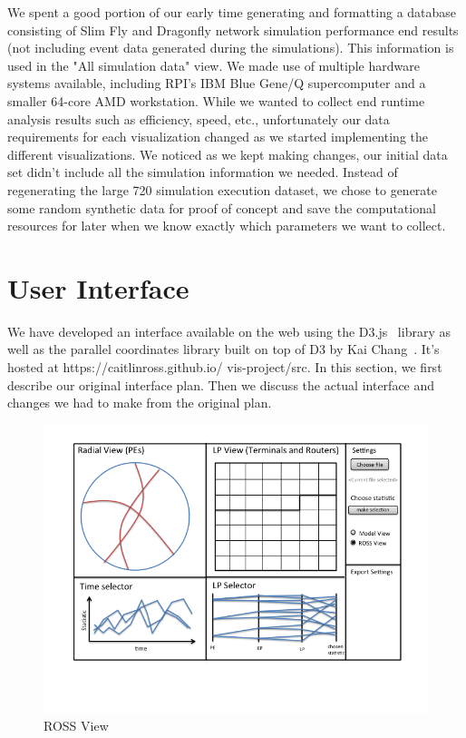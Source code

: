 \documentclass{acm_proc_article-sp}
\begin{document}
We spent a good portion of our early time generating and formatting a database consisting of Slim Fly and Dragonfly network simulation performance end results (not including event data generated during the simulations). This information is used in the "All simulation data" view. We made use of multiple hardware systems available, including RPI's IBM Blue Gene/Q supercomputer and a smaller 64-core AMD workstation. While we wanted to collect end runtime analysis results such as efficiency, speed, etc., unfortunately our data requirements for each visualization changed as we started implementing the different visualizations. We noticed as we kept making changes, our initial data set didn't include all the simulation information we needed. Instead of regenerating the large 720 simulation execution dataset, we chose to generate some random synthetic data for proof of concept and save the computational resources for later when we know exactly which parameters we want to collect. 


\section{User Interface}
We have developed an interface available on the web using the D3.js~\cite{d3} library as well as the parallel coordinates library built on top of D3 by Kai Chang~\cite{chang}.  It's hosted at https://caitlinross.github.io/ vis-project/src.  In this section, we first describe our original interface plan.  Then we discuss the actual interface and changes we had to make from the original plan.  


\begin{figure}[t]
\centering
   \includegraphics[width=5.0in, clip=true, trim=0 1in 0 0]{../../figures/gui-diagram/Slide2.png}
\caption{ROSS View}
\label{ross-view}
\end{figure}
\end{document}
